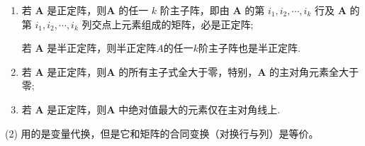 \documentclass[../../main.tex]{subfiles}%
\begin{document}
\begin{proposition}\label{proposition:正定阵的性质}
\begin{enumerate}[(1)]
\item 若 $\boldsymbol{A}$ 是正定阵，则$\boldsymbol{A}$ 的任一 $k$ 阶主子阵，即由 $\boldsymbol{A}$ 的第 $i_1,i_2,\cdots,i_k$ 行及 $\boldsymbol{A}$ 的第 $i_1,i_2,\cdots,i_k$ 列交点上元素组成的矩阵，必是正定阵;

若 $\boldsymbol{A}$ 是半正定阵，则半正定阵$A$的任一$k$阶主子阵也是半正定阵.

\item 若 $\boldsymbol{A}$ 是正定阵，则$\boldsymbol{A}$ 的所有主子式全大于零，特别，$\boldsymbol{A}$ 的主对角元素全大于零;

\item 若 $\boldsymbol{A}$ 是正定阵，则$\boldsymbol{A}$ 中绝对值最大的元素仅在主对角线上.
\end{enumerate} 
\end{proposition}
\begin{remark}
(2) 用的是变量代换，但是它和矩阵的合同变换（对换行与列）是等价。 
\end{remark}
\end{document}
